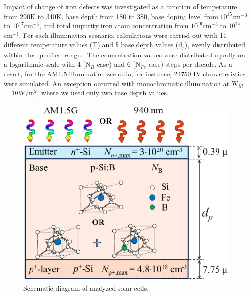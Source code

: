 \documentclass[a4paper,fleqn]{cas-sc}
\begin{document}
Impact of change of iron defects was investigated as a function of temperature from 290K to 340K, base depth from 180\textnormal{\textmu} to 380\textnormal{\textmu}, base doping level from $10^{15}$$\mathrm{cm}^{-3}$ to $10^{17}$$\mathrm{cm}^{-3}$, and total impurity iron atom concentration from $10^{10}$$\mathrm{cm}^{-3}$ to $10^{14}$$\mathrm{cm}^{-3}$. For each illumination scenario, calculations were carried out with 11 different temperature values (T) and 5 base depth values (d$_p$), evenly distributed within the specified ranges. The concentration values were distributed equally on a logarithmic scale with 4 (N$_B$ case) and 6 (N$_{Fe}$ case) steps per decade. As a result, for the AM1.5 illumination scenario, for instance, 24750 IV characteristics were simulated. An exception occurred with monochromatic illumination at W$_{ill}$  = 10W/$\mathrm{m}^{2}$, where we used only two base depth values.

\begin{figure}
	\centering
		\includegraphics{Figure1.png}
	  \caption{Schematic diagram of analyzed solar cells.}\label{fig1}
\end{figure}
\end{document}
